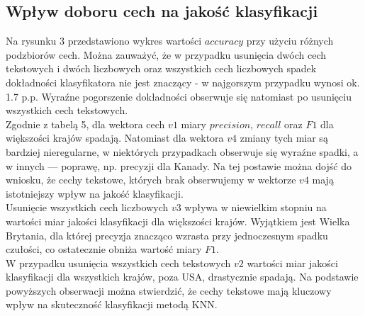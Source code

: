 \documentclass{article}
\begin{document}
\subsection{Wpływ doboru cech na jakość klasyfikacji}
Na rysunku 3 przedstawiono wykres wartości \(accuracy\) przy użyciu różnych podzbiorów cech. Można zauważyć, że w przypadku usunięcia dwóch cech tekstowych i dwóch liczbowych oraz  wszystkich cech liczbowych spadek dokładności klasyfikatora nie jest znaczący - w najgorszym przypadku wynosi ok. 1.7 p.p. Wyraźne pogorszenie dokładności obserwuje się natomiast po usunięciu wszystkich cech tekstowych. \\
Zgodnie z tabelą 5, dla wektora cech \(v1\) miary \(precision\), \(recall\) oraz \(F1\) dla większości krajów spadają. Natomiast dla wektora \(v4\) zmiany tych miar są bardziej nieregularne, w niektórych przypadkach obserwuje się wyraźne spadki, a w innych — poprawę, np. precyzji dla Kanady. Na tej postawie można dojść do wniosku, że cechy tekstowe, których brak obserwujemy w wektorze \(v4\) mają istotniejszy wpływ na jakość klasyfikacji. \\
Usunięcie wszystkich cech liczbowych \(v3\) wpływa w niewielkim stopniu na wartości miar jakości klasyfikacji dla większości krajów. Wyjątkiem jest Wielka Brytania, dla której precyzja znacząco wzrasta przy jednoczesnym spadku czułości, co ostatecznie obniża wartość miary \(F1\). \\
W przypadku usunięcia wszystkich cech tekstowych \(v2\) wartości miar jakości klasyfikacji dla wszystkich krajów, poza USA, drastycznie spadają. Na podstawie powyższych obserwacji można stwierdzić, że cechy tekstowe mają kluczowy wpływ na skuteczność klasyfikacji metodą KNN.
\end{document}
